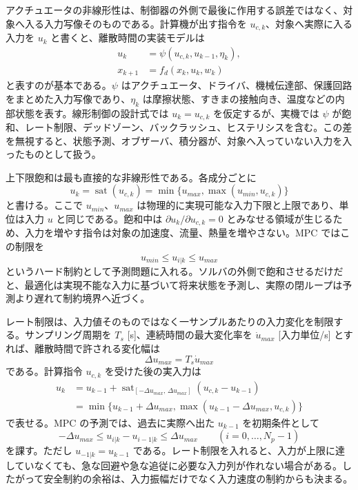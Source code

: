 アクチュエータの非線形性は、制御器の外側で最後に作用する誤差ではなく、対象へ入る入力写像そのものである。計算機が出す指令を $u_{c,k}$、対象へ実際に入る入力を $u_k$ と書くと、離散時間の実装モデルは
\begin{align}
  u_k&=\psi(u_{c,k},u_{k-1},\eta_k),\\
  x_{k+1}&=f_d(x_k,u_k,w_k)
\end{align}
と表すのが基本である。$\psi$ はアクチュエータ、ドライバ、機械伝達部、保護回路をまとめた入力写像であり、$\eta_k$ は摩擦状態、すきまの接触向き、温度などの内部状態を表す。線形制御の設計式では $u_k=u_{c,k}$ を仮定するが、実機では $\psi$ が飽和、レート制限、デッドゾーン、バックラッシュ、ヒステリシスを含む。この差を無視すると、状態予測、オブザーバ、積分器が、対象へ入っていない入力を入ったものとして扱う。

上下限飽和は最も直接的な非線形性である。各成分ごとに
\begin{equation}
  u_k=\operatorname{sat}(u_{c,k})
  =\min\{u_{max},\max(u_{min},u_{c,k})\}
\end{equation}
と書ける。ここで $u_{min}$、$u_{max}$ は物理的に実現可能な入力下限と上限であり、単位は入力 $u$ と同じである。飽和中は $\partial u_k/\partial u_{c,k}=0$ とみなせる領域が生じるため、入力を増やす指令は対象の加速度、流量、熱量を増やさない。MPC ではこの制限を
\begin{equation}
  u_{min}\le u_{i|k}\le u_{max}
\end{equation}
というハード制約として予測問題に入れる。ソルバの外側で飽和させるだけだと、最適化は実現不能な入力に基づいて将来状態を予測し、実際の閉ループは予測より遅れて制約境界へ近づく。

レート制限は、入力値そのものではなく一サンプルあたりの入力変化を制限する。サンプリング周期を $T_s$ [s]、連続時間の最大変化率を $\dot{u}_{max}$ [入力単位/s] とすれば、離散時間で許される変化幅は
\begin{equation}
  \Delta u_{max}=T_s\dot{u}_{max}
\end{equation}
である。計算指令 $u_{c,k}$ を受けた後の実入力は
\begin{align}
  u_k
  &=u_{k-1}
  +\operatorname{sat}_{[-\Delta u_{max},\,\Delta u_{max}]}
    (u_{c,k}-u_{k-1})\\
  &=\min\{u_{k-1}+\Delta u_{max},
      \max(u_{k-1}-\Delta u_{max},u_{c,k})\}
\end{align}
で表せる。MPC の予測では、過去に実際へ出た $u_{k-1}$ を初期条件として
\begin{equation}
  -\Delta u_{max}
  \le u_{i|k}-u_{i-1|k}
  \le \Delta u_{max}
  \qquad (i=0,\ldots,N_p-1)
\end{equation}
を課す。ただし $u_{-1|k}=u_{k-1}$ である。レート制限を入れると、入力が上限に達していなくても、急な回避や急な追従に必要な入力列が作れない場合がある。したがって安全制約の余裕は、入力振幅だけでなく入力速度の制約からも決まる。

